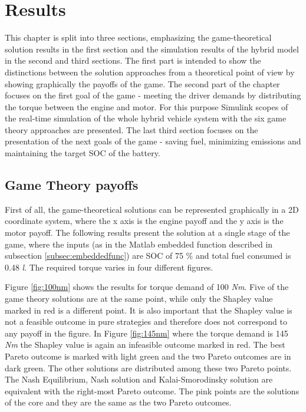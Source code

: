 \chapter{Results}
\label{chp:results}

This chapter is split into three sections, emphasizing the game-theoretical solution results in the first section and the simulation results of the hybrid model in the second and third sections. The first part is intended to show the distinctions between the solution approaches from a theoretical point of view by showing graphically the payoffs of the game. The second part of the chapter focuses on the first goal of the game - meeting the driver demands by distributing the torque between the engine and motor. For this purpose Simulink scopes of the real-time simulation of the whole hybrid vehicle system with the six game theory approaches are presented. The last third section focuses on the presentation of the next goals of the game - saving fuel, minimizing emissions and maintaining the target SOC of the battery.

\section{Game Theory payoffs}
First of all, the game-theoretical solutions can be represented graphically in a 2D coordinate system, where the x axis is the engine payoff and the y axis is the motor payoff. The following results present the solution at a single stage of the game, where the inputs (as in the Matlab embedded function described in subsection \ref{subsec:embeddedfunc}) are SOC of 75 \% and total fuel consumed is 0.48 \textit{l}. The required torque varies in four different figures. 

Figure \ref{fig:100nm} shows the results for torque demand of 100 \textit{Nm}. Five of the game theory solutions are at the same point, while only the Shapley value marked in red is a different point. It is also important that the Shapley value is not a feasible outcome in pure strategies and therefore does not correspond to any payoff in the figure. In Figure \ref{fig:145nm} where the torque demand is 145 \textit{Nm} the Shapley value is again an infeasible outcome marked in red. The best Pareto outcome is marked with light green and the two Pareto outcomes are in dark green. The other solutions are distributed among these two Pareto points. The Nash Equilibrium, Nash solution and Kalai-Smorodinsky solution are equivalent with the right-most Pareto outcome. The pink points are the solutions of the core and they are the same as the two Pareto outcomes.

